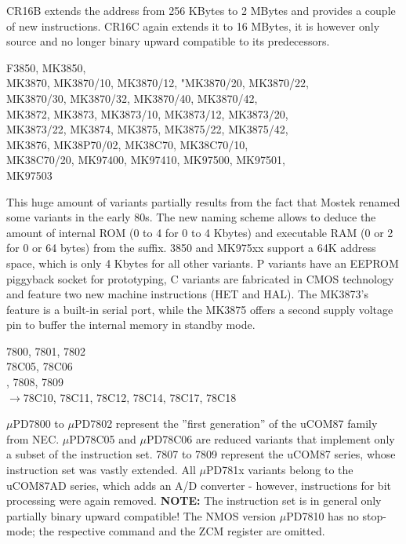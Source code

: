 \documentclass[12pt,twoside]{report}
\newcommand{\bb}[1]{{\bf #1}}
\begin{document}
CR16B extends the address from 256 KBytes to 2 MBytes and provides a
couple of new instructions.  CR16C again extends it to 16 MBytes, it
is however only source and no longer binary upward compatible to its
predecessors.
\begin{cpulist}
   F3850, MK3850, \\
\> MK3870, MK3870/10, MK3870/12, "MK3870/20, MK3870/22, \\
\> MK3870/30, MK3870/32, MK3870/40, MK3870/42, \\
\> MK3872, MK3873, MK3873/10, MK3873/12, MK3873/20, \\
\> MK3873/22, MK3874, MK3875, MK3875/22, MK3875/42, \\
\> MK3876, MK38P70/02, MK38C70, MK38C70/10, \\
\> MK38C70/20, MK97400, MK97410, MK97500, MK97501, \\
\> MK97503
\end{cpulist}
This huge amount of variants partially results from the fact that
Mostek renamed some variants in the early 80s.  The new naming scheme
allows to deduce the amount of internal ROM (0 to 4 for 0 to 4 Kbytes) 
and executable RAM (0 or 2 for 0 or 64 bytes) from the suffix.  3850
and MK975xx support a 64K address space, which is only 4 Kbytes for all
other variants.  P variants have an EEPROM piggyback socket for prototyping,
C variants are fabricated in CMOS technology and feature two new machine
instructions (HET and HAL). The MK3873's feature is a built-in serial port,
while the MK3875 offers a second supply voltage pin to buffer the internal
memory in standby mode.
\begin{cpulist}
   7800, 7801, 7802 \\
\> 78C05, 78C06 \\
, 7808, 7809 \\
$\rightarrow$78C10, 78C11, 78C12, 78C14, 78C17, 78C18
\end{cpulist}
$\mu$PD7800 to $\mu$PD7802 represent the ''first generation'' of the
uCOM87 family from NEC.  $\mu$PD78C05 and $\mu$PD78C06 are reduced
variants that implement only a subset of the instruction set. 7807 to
7809 represent the uCOM87 series, whose instruction set was vastly
extended.  All $\mu$PD781x variants belong to the uCOM87AD series, which
adds an A/D converter - however, instructions for bit processing were
again removed.  \bb{NOTE:} The instruction set is in general only
partially binary upward compatible! The NMOS version $\mu$PD7810 has
no stop-mode; the respective command and the ZCM register are omitted.
\end{document}

